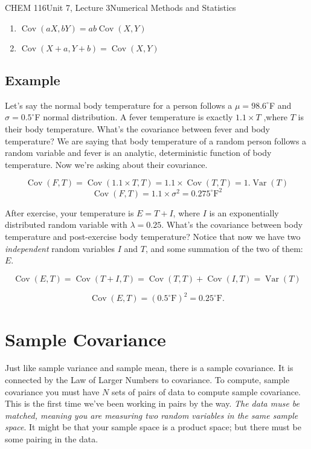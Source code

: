 \documentclass{article}
\DeclareMathOperator{\Var}{Var}
\DeclareMathOperator{\Cov}{Cov}
\begin{document}
\begin{tdoc}{CHEM 116}{Unit 7, Lecture 3}{Numerical Methods and Statistics}
\begin{enumerate}
\item $\Cov(aX, bY) = ab\Cov(X,Y)$\\

\item $\Cov(X + a, Y + b) = \Cov(X,Y)$\\

\end{enumerate}

\subsection{Example}

Let's say the normal body temperature for a person follows a $\mu = 98.6 ^{\circ}$F and $\sigma=0.5 ^{\circ}$F normal distribution. A fever temperature is exactly $1.1\times T$ ,where $T$ is their body temperature. What's the covariance between fever and body temperature? We are saying that body temperature of a random person follows a random variable and fever is an analytic, deterministic function of body temperature. Now we're asking about their covariance.

\[
\Cov(F, T) = \Cov(1.1\times T, T) = 1.1\times \Cov(T, T) = 1. \Var(T)
\]
\[
\Cov(F,T) = 1.1\times \sigma^2 = 0.275^\circ \textrm{F}^2
\]

After exercise, your temperature is $E = T + I$, where $I$ is an
exponentially distributed random variable with $\lambda =0.25$. What's the covariance between body temperature and post-exercise body temperature? Notice that now we have two \textit{independent} random variables $I$ and $T$, and some summation of the two of them: $E$.

\[
\Cov(E, T) = \Cov(T + I, T) = \Cov(T, T) + \Cov(I, T) = \Var(T)
\]

\[
\Cov(E, T) = (0.5^\circ \textrm{F})^2 = 0.25 ^\circ \textrm{F}.
\]

\section{Sample Covariance}

Just like sample variance and sample mean, there is a sample
covariance. It is connected by the Law of Larger Numbers to covariance. To compute, sample covariance you must have $N$ sets of pairs of data to compute sample
covariance. This is the first time we've been working in pairs by the
way. \textit{The data muse be matched, meaning you are measuring two random
variables in the same sample space}. It might be that your sample space
is a product space; but there must be some pairing in the data.


\end{tdoc}
\end{document}
